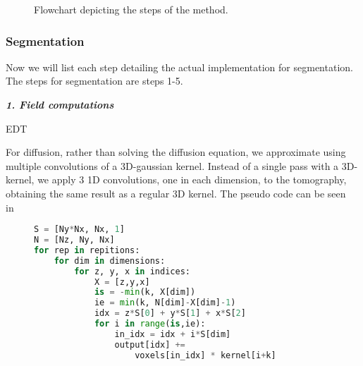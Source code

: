 \begin{figure}
    \centering
    \caption{Flowchart depicting the steps of the method.
    }
    \label{fig:flowchart}
\end{figure}

\subsubsection{Segmentation}
Now we will list each step detailing the actual implementation for segmentation. The steps for segmentation are steps 1-5.

\vspace{\baselineskip}
\noindent\textit{\textbf{1. Field computations}}

EDT

For diffusion, rather than solving the diffusion equation, we approximate using multiple convolutions of a 3D-gaussian kernel.
Instead of a single pass with a 3D-kernel, we apply 3 1D convolutions, one in each dimension, to the tomography, obtaining the same result as a regular 3D kernel.
The pseudo code can be seen in~

\begin{figure}
    \begin{lstlisting}[language=Python,caption=Python-like pseudo code for the diffusion approximation.,label=lis:diffusion]
S = [Ny*Nx, Nx, 1]
N = [Nz, Ny, Nx]
for rep in repitions:
    for dim in dimensions:
        for z, y, x in indices:
            X = [z,y,x]
            is = -min(k, X[dim])
            ie = min(k, N[dim]-X[dim]-1)
            idx = z*S[0] + y*S[1] + x*S[2]
            for i in range(is,ie):
                in_idx = idx + i*S[dim]
                output[idx] +=
                    voxels[in_idx] * kernel[i+k]
    \end{lstlisting}
\end{figure}

